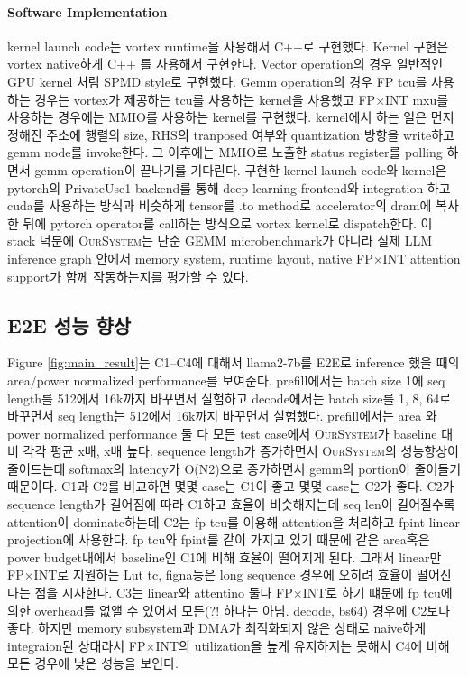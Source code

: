 \documentclass[11pt]{article}
\newcommand{\todo}[1]{\textcolor{red}{[TODO: #1]}}
\newcommand{\ours}{\textsc{OurSystem}}
\newcommand{\fpint}{FP$\times$INT}
\begin{document}
\paragraph{Software Implementation}
kernel launch code는 vortex runtime을 사용해서 C++로 구현했다. Kernel 구현은 vortex native하게 C++ 를 사용해서 구현한다.
Vector operation의 경우 일반적인 GPU kernel 처럼 SPMD style로 구현했다.
Gemm operation의 경우 FP tcu를 사용하는 경우는 vortex가 제공하는 tcu를 사용하는 kernel을 사용했고 \fpint{} mxu를 사용하는 경우에는 MMIO를 사용하는 kernel를 구현했다. kernel에서 하는 일은 먼저 정해진 주소에 행렬의 size, RHS의 tranposed 여부와 quantization 방향을 write하고 gemm node를 invoke한다. 그 이후에는 MMIO로 노출한 status register를 polling 하면서 gemm operation이 끝나기를 기다린다.
구현한 kernel launch code와 kernel은 pytorch의 PrivateUse1 backend를 통해 deep learning frontend와 integration 하고 cuda를 사용하는 방식과 비슷하게 tensor를 .to method로 accelerator의 dram에 복사한 뒤에 pytorch operator를 call하는 방식으로 vortex kernel로 dispatch한다.
이 stack 덕분에 \ours{}는 단순 GEMM microbenchmark가 아니라 실제 LLM inference graph 안에서 memory system, runtime layout, native \fpint{} attention support가 함께 작동하는지를 평가할 수 있다.


\subsection{E2E 성능 향상}

Figure \ref{fig:main_result}는 C1--C4에 대해서 llama2-7b를 E2E로 inference 했을 때의 area/power normalized performance를 보여준다.
prefill에서는 batch size 1에 seq length를 512에서 16k까지 바꾸면서 실험하고 decode에서는 batch size를 1, 8, 64로 바꾸면서 seq length는 512에서 16k까지 바꾸면서 실험했다.
prefill에서는 area 와 power normalized performance 둘 다 모든 test case에서  \ours{}가 baseline 대비 각각 평균 x배, x배 높다.
sequence length가 증가하면서 \ours{}의 성능향상이 줄어드는데 softmax의 latency가 O(N2)으로 증가하면서 gemm의 portion이 줄어들기 때문이다.
C1과 C2를 비교하면 몇몇 case는 C1이 좋고 몇몇 case는 C2가 좋다.
C2가 sequence length가 길어짐에 따라 C1하고 효율이 비슷해지는데 seq len이 길어질수록 attention이 dominate하는데 C2는 fp tcu를 이용해 attention을 처리하고 fpint linear projection에 사용한다. fp tcu와 fpint를 같이 가지고 있기 때문에 같은 area혹은 power budget내에서 baseline인 C1에 비해 효율이 떨어지게 된다. 그래서 linear만 \fpint{}로 지원하는 Lut tc, figna등은 long sequence 경우에 오히려 효율이 떨어진다는 점을 시사한다.
C3는 linear와 attentino 둘다 \fpint{}로 하기 떄문에 fp tcu에 의한 overhead를 없앨 수 있어서 모든(?! 하나는 아님. decode, bs64) 경우에 C2보다 좋다. 하지만 memory subsystem과 DMA가 최적화되지 않은 상태로 naive하게 integraion된 상태라서 \fpint{}의 utilization을 높게 유지하지는 못해서 C4에 비해 모든 경우에 낮은 성능을 보인다. 
\end{document}
